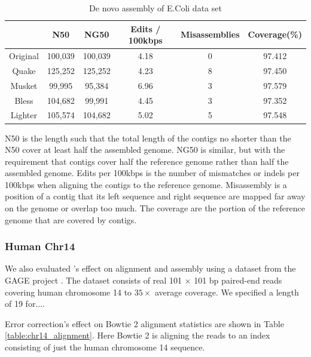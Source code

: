 \documentclass[10pt]{article}
\begin{document}
\begin{table}
\centering
\begin{tabular}{|c|c|c|c|c|c|} \hline
	 	& N50 &	NG50	 & Edits / 100kbps&	Misassemblies	& Coverage(\%) \\ \hline
Original	& 100,039	& 100,039	& 4.18	& 0	& 97.412 \\ \hline
Quake	& 125,252	& 125,252	& 4.23	& 8	& 97.450 \\ \hline
Musket	& 99,995	& 95,384	& 6.96	& 3	& 97.579 \\ \hline
Bless	& 104,682	& 99,991	& 4.45	& 3	& 97.352 \\ \hline
Lighter &	105,574	& 104,682	& 5.02	& 5	& 97.548 \\ \hline
\end{tabular}
\caption{De novo assembly of E.Coli data set\label{table:ecoli_assembly}}
\end{table}

N50 is the length such that the total length of the contigs no shorter than the N50 cover at least half the assembled genome.  NG50 is similar, but with the requirement that contigs cover half the reference genome rather than half the assembled genome. Edits per 100kbps is the number of mismatches or indels per 100kbps when aligning the contigs to the reference genome. Misassembly is a position of a contig that its left sequence and right sequence are mapped far away on the genome or overlap too much. The coverage are the portion of the reference genome that are covered by contigs.

\subsubsection*{Human Chr14}
We also evaluated \tool's effect on alignment and assembly using a dataset from the GAGE project \cite{salzberg2012gage}.  The dataset consists of real 101 $\times$ 101 bp paired-end reads covering human chromosome 14 to $35\times$ average coverage.  We specified a \kmer length of 19 for.... 

Error correction's effect on Bowtie 2 alignment statistics are shown in Table \ref{table:chr14_alignment}.  Here Bowtie 2 is aligning the reads to an index consisting of just the human chromosome 14 sequence.  
\end{document}
